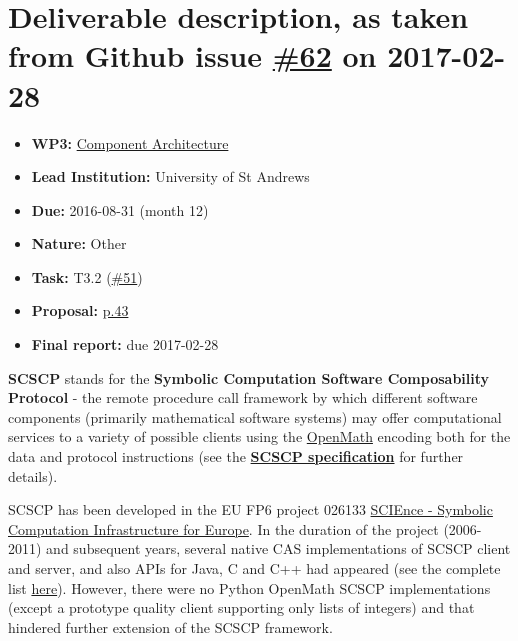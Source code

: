 \section*{\texorpdfstring{Deliverable description, as taken from Github
issue
\href{https://github.com/OpenDreamKit/OpenDreamKit/issues/62}{\#62} on
2017-02-28}{Deliverable description, as taken from Github issue \#62 on 2017-02-28}}\label{deliverable-description-as-taken-from-github-issue-62-on-2017-02-28}

\begin{itemize}
\tightlist
\item
  \textbf{WP3:}
  \href{https://github.com/OpenDreamKit/OpenDreamKit/tree/master/WP3}{Component
  Architecture}
\item
  \textbf{Lead Institution:} University of St Andrews
\item
  \textbf{Due:} 2016-08-31 (month 12)
\item
  \textbf{Nature:} Other
\item
  \textbf{Task:} T3.2
  (\href{https://github.com/OpenDreamKit/OpenDreamKit/issues/51}{\#51})
\item
  \textbf{Proposal:}
  \href{https://github.com/OpenDreamKit/OpenDreamKit/raw/master/Proposal/proposal-www.pdf}{p.43}
\item
  \textbf{Final report:} due 2017-02-28
\end{itemize}

\textbf{SCSCP} stands for the \textbf{Symbolic Computation Software
Composability Protocol} - the remote procedure call framework by which
different software components (primarily mathematical software systems)
may offer computational services to a variety of possible clients using
the \href{http://www.openmath.org/}{OpenMath} encoding both for the data
and protocol instructions (see the
\href{http://www.symbolic-computing.org/scscp}{\textbf{SCSCP
specification}} for further details).

SCSCP has been developed in the EU FP6 project 026133
\href{http://www.symbolic-computing.org/}{SCIEnce - Symbolic Computation
Infrastructure for Europe}. In the duration of the project (2006-2011)
and subsequent years, several native CAS implementations of SCSCP client
and server, and also APIs for Java, C and C++ had appeared (see the
complete list \href{http://www.symbolic-computing.org/}{here}). However,
there were no Python OpenMath SCSCP implementations (except a prototype
quality client supporting only lists of integers) and that hindered
further extension of the SCSCP framework.

